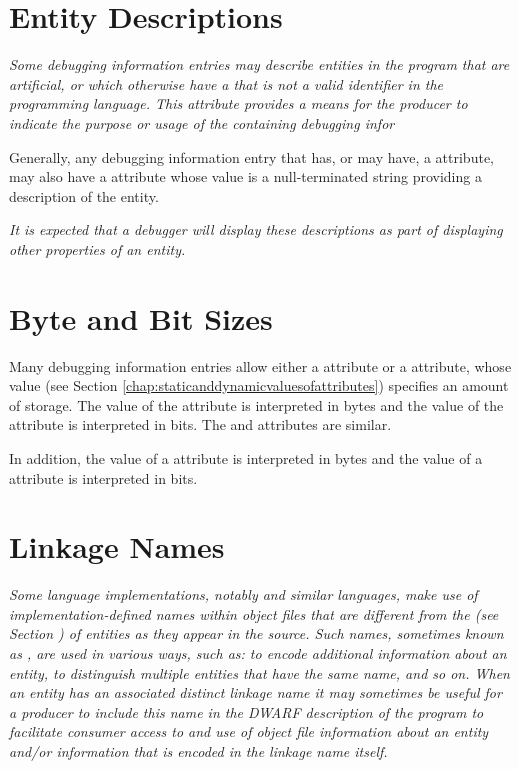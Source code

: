 \section{Entity Descriptions}
\textit{Some debugging information entries may describe entities
in the program that are artificial, or which otherwise have a 
 that is not a valid identifier in the
programming language. 
This attribute provides a means for the producer to indicate
the purpose or usage of the containing debugging infor}

Generally, any debugging information entry that 
has,\hypertarget{chap:DWATdescriptionartificialnameordescription}{}
or may have, a \DWATname{} attribute, may also have a
\DWATdescriptionDEFN{} attribute whose value is a
null-terminated string providing a description of the entity.

\textit{It is expected that a debugger will 
display these descriptions as part of 
displaying other properties of an entity.}

\section{Byte and Bit Sizes}
\label{chap:byteandbitsizes}
Many debugging information entries allow either a
\DWATbytesizeNAME{} attribute or a 
\DWATbitsizeNAME{} attribute,
whose  value 
(see Section \ref{chap:staticanddynamicvaluesofattributes}) 
specifies an
amount of storage. The value of the 
\DWATbytesizeDEFN{} attribute
is interpreted in bytes and the value of the 
\DWATbitsizeDEFN{}
attribute is interpreted in bits. The
\DWATstringlengthbytesize{} and 
\DWATstringlengthbitsize{} 
attributes are similar.

In addition, the 
value of a \DWATbytestride{} attribute is interpreted
in bytes and the  value of a 
\DWATbitstride{}
attribute is interpreted in bits.

\section{Linkage Names}
\label{chap:linkagenames}
\textit{Some language implementations, notably 
 and similar
languages, make use of implementation-defined names within
object files that are different from the 
(see Section ) of entities as they 
appear in the source. Such names, sometimes known as 
,
are used in various ways, such as: to encode additional
information about an entity, to distinguish multiple entities
that have the same name, and so on. When an entity has an
associated distinct linkage name it may sometimes be useful
for a producer to include this name in the DWARF description
of the program to facilitate consumer access to and use of
object file information about an entity and/or information
that is encoded in the linkage name itself.  
}

